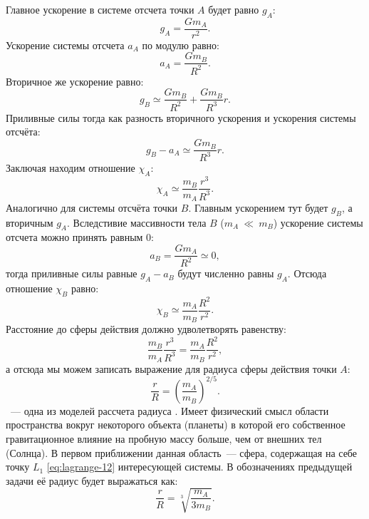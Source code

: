 Главное ускорение в системе отсчета точки $A$ будет равно $g_A$:
\begin{equation*}
	g_A = \frac{Gm_A}{r^2}.
\end{equation*}
Ускорение системы отсчета $a_A$ по модулю равно:
\begin{equation*}
	a_A = \frac{Gm_B}{R^2}.
\end{equation*}
Вторичное же ускорение равно:
\begin{equation*}
	g_B\simeq\frac{Gm_B}{R^2}+\frac{Gm_B}{R^3}r.
\end{equation*}
Приливные силы тогда как разность вторичного ускорения и ускорения системы отсчёта:
\begin{equation*}
	g_B-a_A \simeq \frac{G m_B}{R^3} r.
\end{equation*} 
Заключая находим отношение $\chi_A$:
\begin{equation*}
	\chi_A\simeq\frac{m_B}{m_A} \frac{r^3}{R^3}.
\end{equation*}
Аналогично для системы отсчёта точки $B$. Главным ускорением тут будет $g_B$, а вторичным $g_A$. Вследстивие массивности тела $B$ ($m_A~\ll~m_B$) ускорение системы отсчета можно принять равным 0:
\begin{equation*}
	a_B=\frac{G m_A}{R^2} \simeq 0,
\end{equation*}
тогда приливные силы равные $g_A-a_B$ будут численно равны $g_A$. Отсюда отношение $\chi_B$ равно:
\begin{equation*}
	\chi_B \simeq \frac{m_A}{m_B} \frac{R^2}{r^2}.
\end{equation*}
Расстояние до сферы действия должно удволетворять равенству:
\begin{equation*}
	\frac{m_B}{m_A} \frac{r^3}{R^3}=\frac{m_A}{m_B} \frac{R^2}{r^2},
\end{equation*}
а отсюда мы можем записать выражение для радиуса сферы действия точки $A$:
\begin{equation}
	\frac{r}{R}=\left(\frac{m_A}{m_B}\right)^{2 / 5}.
\end{equation} 
~--- одна из моделей рассчета радиуса . Имеет физический смысл области пространства вокруг некоторого объекта (планеты) в которой его собственное гравитационное влияние на пробную массу больше, чем от внешних тел (Солнца). В первом приближении данная область~--- сфера, содержащая на себе точку $L_1$ \eqref{eq:lagrange-12} интересующей системы. В обозначениях предыдущей задачи её радиус будет выражаться как:
\begin{equation}
	\frac{r}{R} = \sqrt[3]{\frac{m_A}{3m_B}}.
\end{equation}

